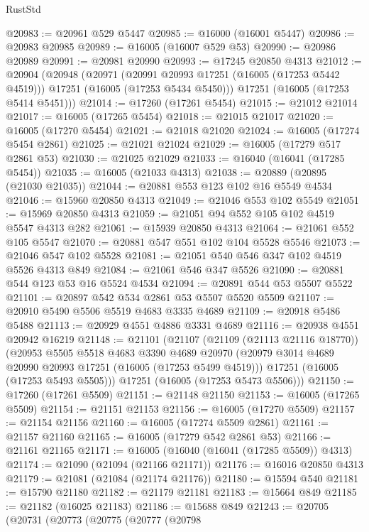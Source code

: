 \begin{lexlean}{RustStd}
\begin{coremodule}
@20983 := @20961 @529 @5447
@20985 := @16000 (@16001 @5447)
@20986 := @20983 @20985
@20989 := @16005 (@16007 @529 @53)
@20990 := @20986 @20989
@20991 := @20981 @20990
@20993 := @17245 @20850 @4313
@21012 := @20904
    (@20948
      (@20971
        (@20991 @20993 @17251 (@16005 (@17253 @5442 @4519)))
        @17251
        (@16005 (@17253 @5434 @5450)))
      @17251
      (@16005 (@17253 @5414 @5451)))
@21014 := @17260 (@17261 @5454)
@21015 := @21012 @21014
@21017 := @16005 (@17265 @5454)
@21018 := @21015 @21017
@21020 := @16005 (@17270 @5454)
@21021 := @21018 @21020
@21024 := @16005 (@17274 @5454 @2861)
@21025 := @21021 @21024
@21029 := @16005 (@17279 @517 @2861 @53)
@21030 := @21025 @21029
@21033 := @16040 (@16041 (@17285 @5454))
@21035 := @16005 (@21033 @4313)
@21038 := @20889 (@20895 (@21030 @21035))
@21044 := @20881 @553 @123 @102 @16 @5549 @4534
@21046 := @15960 @20850 @4313
@21049 := @21046 @553 @102 @5549
@21051 := @15969 @20850 @4313
@21059 := @21051 @94 @552 @105 @102 @4519 @5547 @4313 @282
@21061 := @15939 @20850 @4313
@21064 := @21061 @552 @105 @5547
@21070 := @20881 @547 @551 @102 @104 @5528 @5546
@21073 := @21046 @547 @102 @5528
@21081 := @21051 @540 @546 @347 @102 @4519 @5526 @4313 @849
@21084 := @21061 @546 @347 @5526
@21090 := @20881 @544 @123 @53 @16 @5524 @4534
@21094 := @20891 @544 @53 @5507 @5522
@21101 := @20897 @542 @534 @2861 @53 @5507 @5520 @5509
@21107 := @20910 @5490 @5506 @5519 @4683 @3335 @4689
@21109 := @20918 @5486 @5488
@21113 := @20929 @4551 @4886 @3331 @4689
@21116 := @20938 @4551 @20942 @16219
@21148 := @21101
    (@21107
      (@21109 (@21113 @21116 @18770))
      (@20953
        @5505
        @5518
        @4683
        @3390
        @4689
        @20970
        (@20979 @3014 @4689 @20990 @20993 @17251 (@16005 (@17253 @5499 @4519)))
        @17251
        (@16005 (@17253 @5493 @5505)))
      @17251
      (@16005 (@17253 @5473 @5506)))
@21150 := @17260 (@17261 @5509)
@21151 := @21148 @21150
@21153 := @16005 (@17265 @5509)
@21154 := @21151 @21153
@21156 := @16005 (@17270 @5509)
@21157 := @21154 @21156
@21160 := @16005 (@17274 @5509 @2861)
@21161 := @21157 @21160
@21165 := @16005 (@17279 @542 @2861 @53)
@21166 := @21161 @21165
@21171 := @16005 (@16040 (@16041 (@17285 @5509)) @4313)
@21174 := @21090 (@21094 (@21166 @21171))
@21176 := @16016 @20850 @4313
@21179 := @21081 (@21084 (@21174 @21176))
@21180 := @15594 @540
@21181 := @15790 @21180
@21182 := @21179 @21181
@21183 := @15664 @849
@21185 := @21182 (@16025 @21183)
@21186 := @15688 @849
@21243 := @20705
    (@20731
      (@20773
        (@20775
          (@20777
            (@20798

\end{coremodule}
\end{lexlean}
